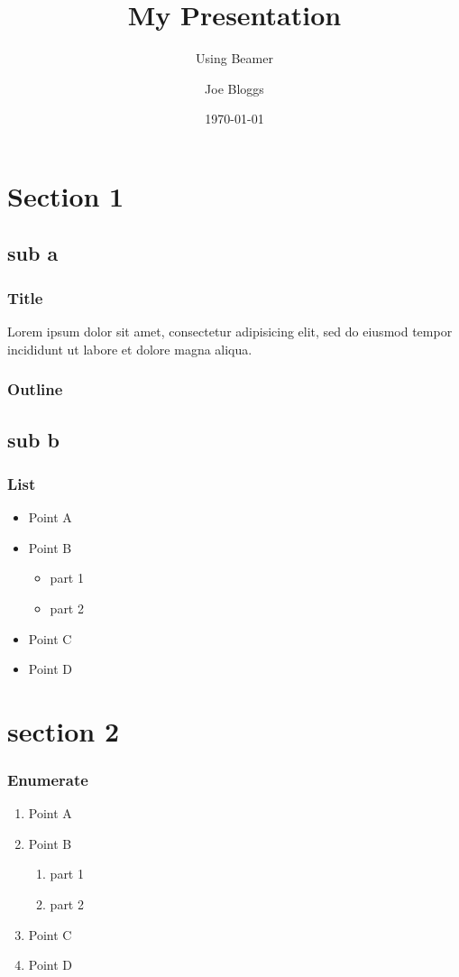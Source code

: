 \documentclass{beamer}
\title{My Presentation}
\subtitle{Using Beamer}
\author{Joe Bloggs}
\institute{University of ShareLaTeX}
\date{\today}
\begin{document}


\begin{frame}
\titlepage
\end{frame}

\section{Section 1}
\subsection{sub a}

\begin{frame}
\frametitle{Title}
Lorem ipsum dolor sit amet, consectetur adipisicing elit, sed do eiusmod tempor incididunt ut labore et dolore magna aliqua.
\end{frame}

\begin{frame}
\frametitle{Outline}
\tableofcontents
\end{frame}

\subsection{sub b}
\begin{frame}
\frametitle{List}
\begin{itemize}
\item Point A
\item Point B
\begin{itemize}
\item part 1
\item part 2
\end{itemize}
\item Point C
\item Point D
\end{itemize}
\end{frame}

\section{section 2}
\begin{frame}
  \frametitle{Enumerate}
  \begin{enumerate}[I]
  \item Point A
  \item Point B
    \begin{enumerate}[i]
    \item part 1
    \item part 2
    \end{enumerate}
  \item Point C
  \item Point D
  \end{enumerate}

\end{frame}
\end{document}
